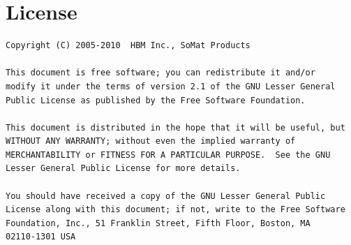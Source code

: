 \documentclass{article}
\begin{document}
\appendix

\section{License}

\begin{verbatim}
Copyright (C) 2005-2010  HBM Inc., SoMat Products

This document is free software; you can redistribute it and/or
modify it under the terms of version 2.1 of the GNU Lesser General
Public License as published by the Free Software Foundation.

This document is distributed in the hope that it will be useful, but
WITHOUT ANY WARRANTY; without even the implied warranty of
MERCHANTABILITY or FITNESS FOR A PARTICULAR PURPOSE.  See the GNU
Lesser General Public License for more details.

You should have received a copy of the GNU Lesser General Public
License along with this document; if not, write to the Free Software
Foundation, Inc., 51 Franklin Street, Fifth Floor, Boston, MA
02110-1301 USA
\end{verbatim}
\end{document}
